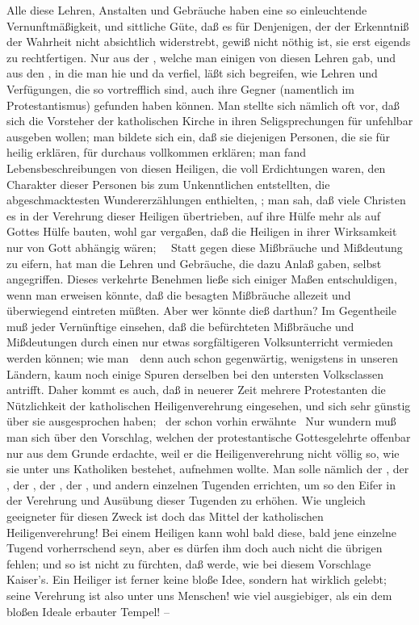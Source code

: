 \begin{RWanm} 
Alle diese Lehren, Anstalten und Gebräuche haben eine so einleuchtende Vernunftmäßigkeit, und sittliche Güte, daß es für Denjenigen, der der Erkenntniß der Wahrheit nicht absichtlich widerstrebt, gewiß nicht nöthig ist, sie erst eigends zu rechtfertigen. Nur aus der , welche man einigen von diesen Lehren gab, und aus den , in die man hie und da verfiel, läßt sich begreifen, wie Lehren und Verfügungen, die so vortrefflich sind, auch ihre Gegner (namentlich im Protestantismus) gefunden haben können. Man stellte sich nämlich oft vor, daß sich die Vorsteher der katholischen Kirche in ihren Seligsprechungen für unfehlbar ausgeben wollen; man bildete sich ein, daß sie diejenigen Personen, die sie für heilig erklären, für durchaus vollkommen erklären; man fand Lebensbeschreibungen von diesen Heiligen, die voll Erdichtungen waren, den Charakter dieser Personen bis zum Unkenntlichen entstellten, die abgeschmacktesten Wundererzählungen enthielten, \usw ; man sah, daß viele Christen es in der Verehrung dieser Heiligen übertrieben, auf ihre Hülfe mehr als auf Gottes Hülfe bauten, wohl gar vergaßen, daß die Heiligen in ihrer Wirksamkeit nur von Gott abhängig wären; \usw\ \usw\ Statt gegen diese Mißbräuche und Mißdeutung zu eifern, hat man die Lehren und Gebräuche, die dazu Anlaß gaben, selbst angegriffen. Dieses verkehrte Benehmen ließe sich einiger Maßen entschuldigen, wenn man erweisen könnte, daß die besagten Mißbräuche allezeit und überwiegend eintreten müßten. Aber wer könnte dieß darthun? Im Gegentheile muß jeder Vernünftige einsehen, daß die befürchteten Mißbräuche und Mißdeutungen durch einen nur etwas sorgfältigeren Volksunterricht vermieden werden können; wie man~\ denn auch schon gegenwärtig, wenigstens in unseren Ländern, kaum noch einige Spuren derselben bei den untersten Volksclassen antrifft. Daher kommt es auch, daß in neuerer Zeit mehrere Protestanten die Nützlichkeit der katholischen Heiligenverehrung eingesehen, und sich sehr günstig über sie ausgesprochen haben; \zB\  der schon vorhin erwähnte  \uA\ Nur wundern muß man sich über den Vorschlag, welchen der protestantische Gottesgelehrte  offenbar nur aus dem Grunde erdachte, weil er die Heiligenverehrung nicht völlig so, wie sie unter uns Katholiken bestehet, aufnehmen wollte. Man solle nämlich der , der , der , der , der , und andern einzelnen Tugenden  errichten, um so den Eifer in der Verehrung und Ausübung dieser Tugenden zu erhöhen. Wie ungleich geeigneter für diesen Zweck ist doch das Mittel der katholischen Heiligenverehrung! Bei einem Heiligen kann wohl bald diese, bald jene einzelne Tugend vorherrschend seyn, aber es dürfen ihm doch auch nicht die übrigen fehlen; und so ist nicht zu fürchten, daß  werde, wie bei diesem Vorschlage Kaiser's. Ein Heiliger ist ferner keine bloße Idee, sondern hat wirklich gelebt; seine Verehrung ist also  unter uns Menschen! wie viel ausgiebiger, als ein dem bloßen Ideale erbauter Tempel! -- 

\end{RWanm}
